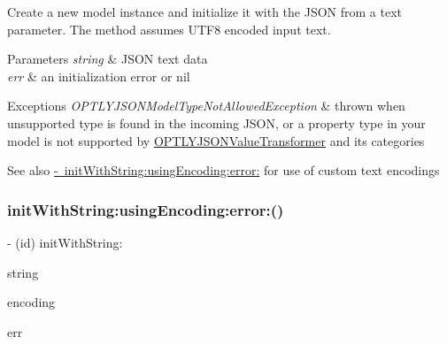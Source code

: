 Create a new model instance and initialize it with the J\+S\+ON from a text parameter. The method assumes U\+T\+F8 encoded input text. 
\begin{DoxyParams}{Parameters}
{\em string} & J\+S\+ON text data \\
\hline
{\em err} & an initialization error or nil \\
\hline
\end{DoxyParams}

\begin{DoxyExceptions}{Exceptions}
{\em O\+P\+T\+L\+Y\+J\+S\+O\+N\+Model\+Type\+Not\+Allowed\+Exception} & thrown when unsupported type is found in the incoming J\+S\+ON, or a property type in your model is not supported by \mbox{\hyperlink{interface_o_p_t_l_y_j_s_o_n_value_transformer}{O\+P\+T\+L\+Y\+J\+S\+O\+N\+Value\+Transformer}} and its categories \\
\hline
\end{DoxyExceptions}
\begin{DoxySeeAlso}{See also}
\mbox{\hyperlink{interface_o_p_t_l_y_j_s_o_n_model_af84f531355d015c8c7e6cbaca8215476}{-\/ init\+With\+String\+:using\+Encoding\+:error\+:}} for use of custom text encodings 
\end{DoxySeeAlso}
\mbox{\label{interface_o_p_t_l_y_j_s_o_n_model_af84f531355d015c8c7e6cbaca8215476}} 
\subsubsection{\texorpdfstring{init\+With\+String\+:using\+Encoding\+:error\+:()}{initWithString:usingEncoding:error:()}}
{\footnotesize\ttfamily -\/ (id) init\+With\+String\+: \begin{DoxyParamCaption}\item[{(N\+S\+String $\ast$)}]{string }\item[{usingEncoding:(N\+S\+String\+Encoding)}]{encoding }\item[{error:(\mbox{\hyperlink{interface_o_p_t_l_y_j_s_o_n_model_error}{O\+P\+T\+L\+Y\+J\+S\+O\+N\+Model\+Error}} $\ast$$\ast$)}]{err }\end{DoxyParamCaption}}

